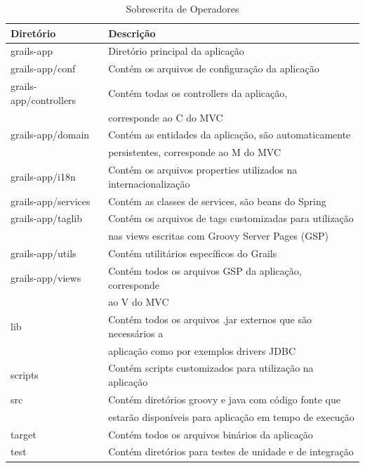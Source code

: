 \documentclass[12pt]{article}
\begin{document}
     \begin{table}[h]
          \centering
          \caption{Sobrescrita de Operadores}
          \label{tab:appStructure}
          \begin{tabular}{| l | l |}
          \hline
          {\bf Diretório} & {\bf Descrição} \\
          \hline
              grails-app & Diretório principal da aplicação \\
          \hline
               grails-app/conf & Contém os arquivos de configuração da aplicação \\
          \hline
              grails-app/controllers &  Contém todas os controllers da aplicação, \\
                                     & corresponde ao C do MVC\\
          \hline
              grails-app/domain & Contém as entidades da aplicação, são automaticamente\\
                                & persistentes, corresponde ao M do MVC \\
          \hline
              grails-app/i18n & Contém os arquivos properties utilizados na internacionalização \\
          \hline
              grails-app/services  & Contém as classes de services, são beans do Spring \\
          \hline
              grails-app/taglib & Contém os arquivos de tags customizadas para utilização \\
                                & nas views escritas com Groovy Server Pages (GSP) \\
          \hline
              grails-app/utils & Contém utilitários específicos do Grails \\ 
          \hline
              grails-app/views & Contém todos os arquivos GSP da aplicação, corresponde \\
                               & ao V do MVC \\
          \hline
              lib & Contém todos os arquivos .jar externos que são necessários a\\
                  &  aplicação como por exemplos drivers JDBC \\
          \hline
              scripts & Contém scripts customizados para utilização na aplicação \\
          \hline
              src & Contém diretórios groovy e java com código fonte que \\
                  & estarão disponíveis para aplicação em tempo de execução \\
          \hline
              target & Contém todos os arquivos binários da aplicação \\
          \hline
              test & Contém diretórios para testes de unidade e de integração\\
          \hline
          \end{tabular}  
      \end{table}
    
\end{document}
